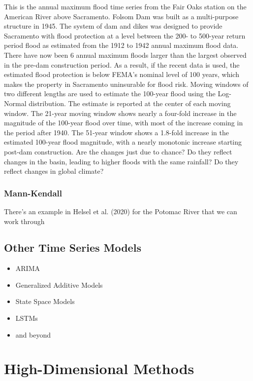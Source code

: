 \documentclass[
  letterpaper,
  DIV=11,
  numbers=noendperiod]{scrreprt}
\providecommand{\tightlist}{%
  \setlength{\itemsep}{0pt}\setlength{\parskip}{0pt}}
\begin{document}
This is the annual maximum flood time series from the Fair Oaks station
on the American River above Sacramento. Folsom Dam was built as a
multi-purpose structure in 1945. The system of dam and dikes was
designed to provide Sacramento with flood protection at a level between
the 200- to 500-year return period flood as estimated from the 1912 to
1942 annual maximum flood data. There have now been 6 annual maximum
floods larger than the largest observed in the pre-dam construction
period. As a result, if the recent data is used, the estimated flood
protection is below FEMA's nominal level of 100 years, which makes the
property in Sacramento uninsurable for flood risk. Moving windows of two
different lengths are used to estimate the 100-year flood using the
Log-Normal distribution. The estimate is reported at the center of each
moving window. The 21-year moving window shows nearly a four-fold
increase in the magnitude of the 100-year flood over time, with most of
the increase coming in the period after 1940. The 51-year window shows a
1.8-fold increase in the estimated 100-year flood magnitude, with a
nearly monotonic increase starting post-dam construction. Are the
changes just due to chance? Do they reflect changes in the basin,
leading to higher floods with the same rainfall? Do they reflect changes
in global climate?

\subsubsection{Mann-Kendall}\label{mann-kendall}

There's an example in Helsel et al. (2020) for the Potomac River that we
can work through

\subsection{Other Time Series Models}\label{other-time-series-models}

\begin{itemize}
\tightlist
\item
  ARIMA
\item
  Generalized Additive Models
\item
  State Space Models
\item
  LSTMs
\item
  and beyond
\end{itemize}

\section{High-Dimensional Methods}\label{high-dimensional-methods}
\end{document}
